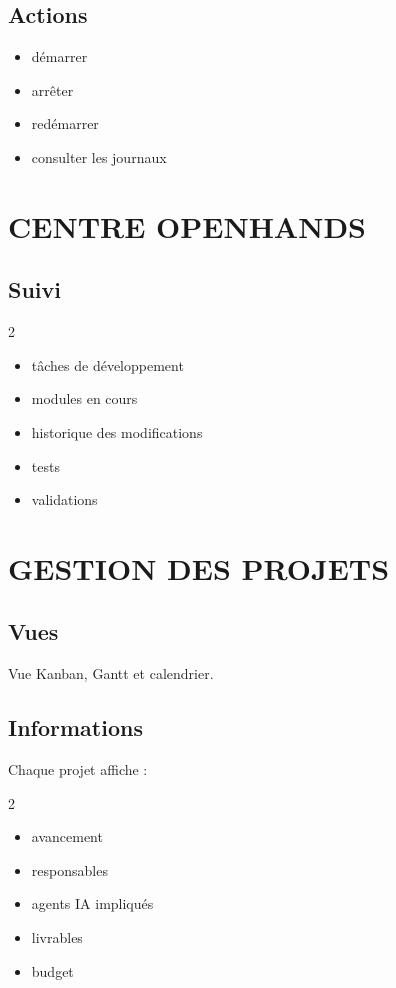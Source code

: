 \documentclass[12pt,a4paper,oneside]{book}
\begin{document}
\section{Actions}
\begin{itemize}
\item démarrer
\item arrêter
\item redémarrer
\item consulter les journaux
\end{itemize}

\chapter{CENTRE OPENHANDS}

\section{Suivi}
\begin{multicols}{2}
\begin{itemize}
\item tâches de développement
\item modules en cours
\item historique des modifications
\item tests
\item validations
\end{itemize}
\end{multicols}

\chapter{GESTION DES PROJETS}

\section{Vues}
Vue Kanban, Gantt et calendrier.

\section{Informations}
Chaque projet affiche :
\begin{multicols}{2}
\begin{itemize}
\item avancement
\item responsables
\item agents IA impliqués
\item livrables
\item budget
\end{itemize}
\end{multicols}
\end{document}
